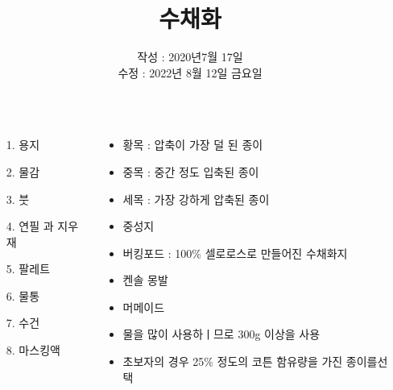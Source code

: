 \documentclass[	20pt, 
							a0paper, 
							landscape, %
							margin=0mm, %
							innermargin=4mm,  		%
							blockverticalspace=4mm, %
							colspace=5mm, 
							subcolspace=0mm
							]{tikzposter}
\title{ 수채화 }
\author{ 	작성 : 2020년7월 17일 \\
			수정 : 2022년 8월 12일 금요일 }
\begin{document}
	\maketitle[
					width=841mm,
					linewidth = 2mm,
					innersep=4mm,
					titletextscale =4, 
				]




	\begin{columns}


			{
				\begin{LARGE}
					\begin{itemize}
					\item [1.] 용지
					\item [2.] 물감
					\item [3.] 붓
					\item [4.] 연필 과 지우재
					\item [5.] 팔레트
					\item [6.] 물통
					\item [7.] 수건
					\item [8.] 마스킹액

					\end{itemize}
				\end{LARGE}
			}


		{

			\begin{LARGE}
			\begin{itemize}
			\item 황목 : 압축이 가장 덜 된 종이
			\item 중목 : 중간 정도 입축된 종이
			\item 세목 : 가장 강하게 압축된 종이
			\item 중성지
			\item 버킹포드 : 100\% 셀로로스로 만들어진 수채화지
			\item 켄솔 몽발
			\item 머메이드
			\item 물을 많이 사용하ㅣ므로 300g 이상을 사용
			\item 초보자의 경우 25\% 정도의 코튼 함유량을 가진 종이를선택
			\end{itemize}
			\end{LARGE}

}
\end{columns}
\end{document}
